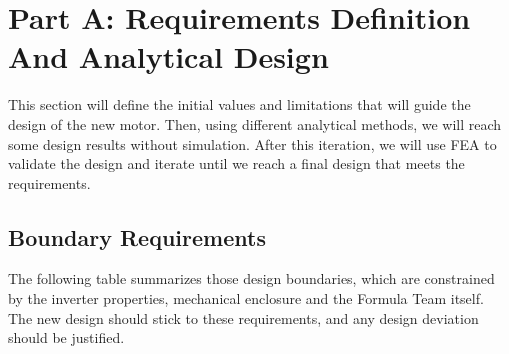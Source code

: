 \documentclass[11pt,a4paper]{article}
\begin{document}
\section{Part A: Requirements Definition And Analytical Design}
This section will define the initial values and limitations that will guide the design of the new motor. Then, using different analytical methods, we will reach some design results without simulation. After this iteration, we will use FEA to validate the design and iterate until we reach a final design that meets the requirements.
\subsection{Boundary Requirements}
The following table summarizes those design boundaries, which are constrained by the inverter properties, mechanical enclosure and the Formula Team itself. The new design should stick to these requirements, and any design deviation should be justified.
\end{document}
